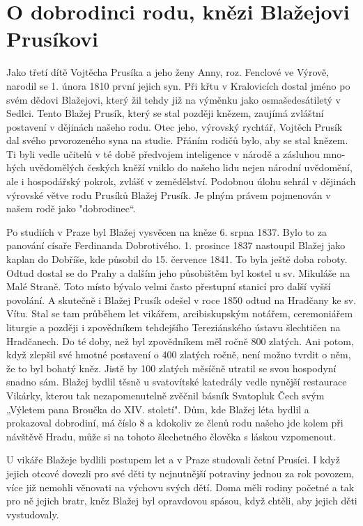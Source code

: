 \documentclass[../dejiny-rodu-prusiku.tex]{subfiles}
\begin{document}
\section{O dobrodinci rodu, knězi Blažejovi Prusíkovi}

Jako třetí dítě Vojtěcha Prusíka a jeho ženy Anny, roz. Fenclové ve Výrově, narodil se 1. února 1810 první jejich syn. Při křtu v Kralovicích dostal jméno po svém dědovi Blažejovi, který žil tehdy již na výměnku jako osmašedesátiletý v Sedlci. Tento Blažej Prusík, který se stal později knězem, zaujímá  zvláštní postavení v dějinách našeho rodu. Otec jeho, výrovský rychtář, Vojtěch Prusík dal svého prvorozeného syna na studie. Přáním rodičů bylo, aby se stal knězem. Ti byli vedle učitelů v té době předvojem inteligence v národě a zásluhou mno­hých uvědomělých českých kněží vniklo do našeho lidu ne­jen národní uvědomění, ale i hospodářský pokrok, zvlášť v zemědělství. Podobnou úlohu sehrál v dějinách výrovské větve rodu Prusíků Blažej Prusík. Je plným právem pojmenován v našem rodě jako "dobrodinec“.

Po studiích v Praze byl Blažej vysvěcen na kněze 6. srpna 1837. Bylo to za panování císaře Ferdinanda Dobrotivého. 1. prosince 1837 nastoupil Blažej jako kaplan do Dobříše, kde působil do 15. července 1841. To byla ještě doba roboty. Odtud dostal se do Prahy a dalším jeho působištěm byl kostel u sv. Mikuláše na Malé Straně. Toto místo bývalo velmi často přestupní stanicí pro další vyšší povolání. A skutečně i Blažej Prusík odešel v roce 1850 odtud na Hradčany ke sv. Vítu. Stal se tam průběhem let vikářem, arcibiskupským notářem, ceremoniářem liturgie a později i zpovědníkem tehdejšího Tereziánského ústavu šlechtičen na Hradčanech. Do té doby, než byl zpovědníkem měl ročně 800 zlatých. Ani potom, když zlepšil své hmotné postavení o 400 zlatých ročně, není možno tvrdit o něm, že to byl bohatý kněz. Jistě by 100 zlatých měsíčně utratil se svou hospodyní snadno sám. Blažej bydlil těsně u svatovítské katedrály vedle nynější restaurace Vikárky, kterou tak nezapomenutelně zvěčnil básník Svatopluk Čech svým „Výletem pana Broučka do XIV. století". Dům, kde Blažej léta bydlil a prokazoval dobrodiní, má číslo 8 a kdokoliv ze členů rodu našeho jde kolem při návštěvě Hradu, může si na tohoto šlechetného člověka s láskou vzpomenout.

U vikáře Blažeje bydlili postupem let a v Praze studova­li četní Prusíci. I když jejich otcové dovezli pro své děti ty nejnutnější potraviny jednou za rok povozem, více již nemohli věnovati na výchovu svých dětí. Doma  měli rodiny početné a tak pro ně jejich bratr, kněz Blažej byl opravdovou spásou, když chtěli, aby jejich děti vystudovaly.
\end{document}
